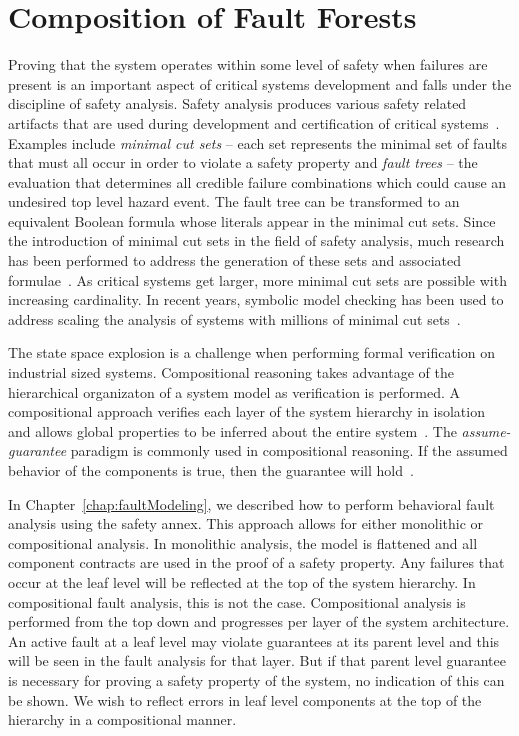 \chapter{Composition of Fault Forests}
\label{chap:compFF}
Proving that the system operates within some level of safety when failures are present is an important aspect of critical systems development and falls under the discipline of safety analysis. Safety analysis produces various safety related artifacts that are used during development and certification of critical systems~\cite{SAE:ARP4754A}. Examples include {\em minimal cut sets} -- each set represents the minimal set of faults that must all occur in order to violate a safety property and {\em fault trees} -- the evaluation that determines all credible failure combinations which could cause an undesired top level hazard event. The fault tree can be transformed to an equivalent Boolean formula whose literals appear in the minimal cut sets. Since the introduction of minimal cut sets in the field of safety analysis, much research has been performed to address the generation of these sets and associated formulae~\cite{vesely1981fault,fta:survey,historyFTA}. As critical systems get larger, more minimal cut sets are possible with increasing cardinality. In recent years, symbolic model checking has been used to address scaling the analysis of systems with millions of minimal cut sets~\cite{bieber2002combination,schafer2003combining,symbFTA}. 

The state space explosion is a challenge when performing formal verification on industrial sized systems. Compositional reasoning takes advantage of the hierarchical organizaton of a system model as verification is performed. A compositional approach verifies each layer of the system hierarchy in isolation and allows global properties to be inferred about the entire system~\cite{berezin1997compositional}. The {\em assume-guarantee} paradigm is commonly used in compositional reasoning. If the assumed behavior of the components is true, then the guarantee will hold~\cite{NFM2012:CoGaMiWhLaLu}.

In Chapter~\ref{chap:faultModeling}, we described how to perform behavioral fault analysis using the safety annex. This approach allows for either monolithic or compositional analysis. In monolithic analysis, the model is flattened and all component contracts are used in the proof of a safety property. Any failures that occur at the leaf level will be reflected at the top of the system hierarchy. In compositional fault analysis, this is not the case. Compositional analysis is performed from the top down and progresses per layer of the system architecture. An active fault at a leaf level may violate guarantees at its parent level and this will be seen in the fault analysis for that layer. But if that parent level guarantee is necessary for proving a safety property of the system, no indication of this can be shown. We wish to reflect errors in leaf level components at the top of the hierarchy in a compositional manner. 

